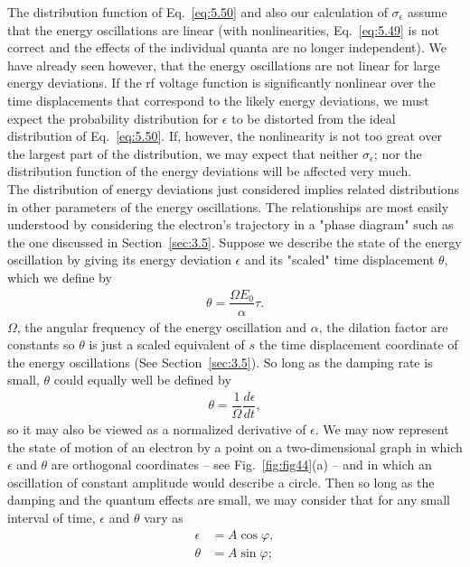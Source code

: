 The distribution function of Eq.~\eqref{eq:5.50} and also our calculation of $\sigma_\epsilon$ assume that the energy oscillations are linear (with nonlinearities, Eq.~\eqref{eq:5.49} is not
correct and the effects of the individual quanta are no longer independent). We have already seen however, that the energy oscillations are not linear for large energy deviations. If the rf voltage function is significantly nonlinear over the time displacements that correspond to the likely energy deviations, we must expect the probability distribution for $\epsilon$ to be distorted from the ideal distribution of Eq.~\eqref{eq:5.50}. If, however, the nonlinearity
 is not too great over the largest part of the distribution, we may expect that neither $\sigma_\epsilon$; nor the distribution function of the energy deviations will be affected very much.\\
The distribution of energy deviations just considered implies related distributions in other parameters of the energy oscillations. The relationships are most easily understood by considering the electron's trajectory in a "phase diagram" such as the one discussed in Section~\ref{sec:3.5}. Suppose we describe the state of the energy oscillation by giving its energy deviation $\epsilon$ and its "scaled" time displacement $\theta$, which we define by
\begin{align} \label{eq:5.52}
	\theta = \dfrac{\Omega E_0}{\alpha} \tau.
\end{align}
$\Omega$, the angular frequency of the energy oscillation and $\alpha$, the dilation factor are
constants so $\theta$ is just a scaled equivalent of $s$ the time displacement coordinate of
the energy oscillations (See Section~\ref{sec:3.5}). So long as the damping rate is small, $\theta$ could equally well be defined by
\begin{align}
	\theta = \dfrac{1}{\Omega} \dfrac{d\epsilon}{dt},
\end{align}
so it may also be viewed as a normalized derivative of $\epsilon$. We may now represent the state of motion of an electron by a point on a two-dimensional graph in which $\epsilon$ and $\theta$ are orthogonal coordinates -- see Fig.~\ref{fig:fig44}(a) -- and in which an oscillation
of constant amplitude would describe a circle. Then so long as the damping and the quantum effects are small, we may consider that for any small interval of time, $\epsilon$ and $\theta$ vary as
\begin{align}
	\epsilon &= A \cos\varphi,\\
    \theta &= A \sin\varphi;
\end{align}
